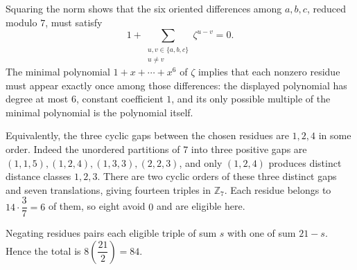 Squaring the norm shows that the six oriented differences among $a,b,c$, reduced modulo $7$, must satisfy
\[
1+\sum_{\substack{u,v\in\{a,b,c\}\\u\ne v}}\zeta^{u-v}=0.
\]
The minimal polynomial $1+x+\cdots+x^6$ of $\zeta$ implies that each nonzero residue must appear exactly once among those differences: the displayed polynomial has degree at most $6$, constant coefficient $1$, and its only possible multiple of the minimal polynomial is the polynomial itself.

Equivalently, the three cyclic gaps between the chosen residues are $1,2,4$ in some order. Indeed the unordered partitions of $7$ into three positive gaps are $(1,1,5),(1,2,4),(1,3,3),(2,2,3)$, and only $(1,2,4)$ produces distinct distance classes $1,2,3$. There are two cyclic orders of these three distinct gaps and seven translations, giving fourteen triples in $\mathbb Z_7$. Each residue belongs to $14\cdot\dfrac{3}{7}=6$ of them, so eight avoid $0$ and are eligible here.

Negating residues pairs each eligible triple of sum $s$ with one of sum $21-s$. Hence the total is $8(\dfrac{21}{2})=\boxed{84}$.
